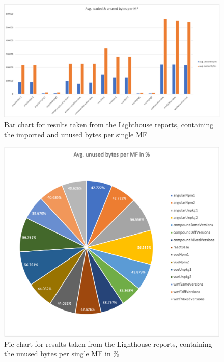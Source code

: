 \begin{figure}[!h]
	\centering
	\begin{adjustbox}{width=\textwidth,totalheight=0.7\textheight}
		\includegraphics[angle=90]{Figures/avg_unsed_imported_mfe_1.png}
	\end{adjustbox}
	\caption{Bar chart for results taken from the Lighthouse reports, containing the imported and unused bytes per single MF}
	\label{fig:appendix_3_1}
\end{figure}
\newpage
\begin{figure}[!h]
	\centering
	\begin{adjustbox}{width=\textwidth,totalheight=\textheight}
		\includegraphics[angle=90]{Figures/avg_unsed_imported_mfe_2.png}
	\end{adjustbox}
	\caption{Pie chart for results taken from the Lighthouse reports, containing the unused bytes per single MF in \%}
	\label{fig:appendix_3_2}
\end{figure}
